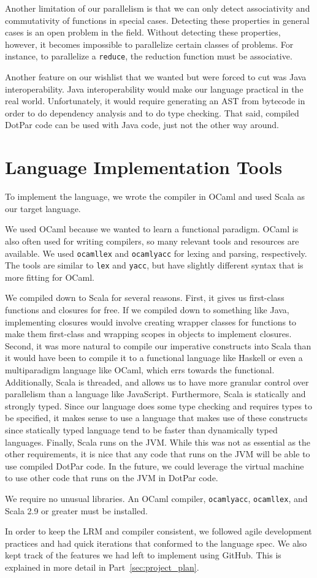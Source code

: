 Another limitation of our parallelism is that we can only detect associativity
and commutativity of functions in special cases. Detecting these properties in
general cases is an open problem in the field. Without detecting these
properties, however, it becomes impossible to parallelize certain classes of
problems. For instance, to parallelize a \verb$reduce$, the reduction function
must be associative.

Another feature on our wishlist that we wanted but were forced to cut was Java
interoperability. Java interoperability would make our language practical in the
real world. Unfortunately, it would require generating an AST from bytecode in
order to do dependency analysis and to do type checking. That said, compiled
DotPar code can be used with Java code, just not the other way around.

\section{Language Implementation Tools}
To implement the language, we wrote the compiler in OCaml and used Scala as our
target language.

We used OCaml because we wanted to learn a functional paradigm. OCaml is also
often used for writing compilers, so many relevant tools and resources are
available. We used \verb$ocamllex$ and \verb$ocamlyacc$ for lexing and parsing,
respectively. The tools are similar to \verb$lex$ and \verb$yacc$, but have
slightly different syntax that is more fitting for OCaml.

We compiled down to Scala for several reasons. First, it gives us first-class
functions and closures for free. If we compiled down to something like Java,
implementing closures would involve creating wrapper classes for functions to
make them first-class and wrapping scopes in objects to implement closures.
Second, it was more natural to compile our imperative constructs into Scala than
it would have been to compile it to a functional language like Haskell or even a
multiparadigm language like OCaml, which errs towards the functional.
Additionally, Scala is threaded, and allows us to have more granular control
over parallelism than a language like JavaScript. Furthermore, Scala is
statically and strongly typed. Since our language does some type checking and
requires types to be specified, it makes sense to use a language that makes use
of these constructs since statically typed language tend to be faster than
dynamically typed languages. Finally, Scala runs on the JVM\@. While this was not
as essential as the other requirements, it is nice that any code that runs on
the JVM will be able to use compiled DotPar code. In the future, we could
leverage the virtual machine to use other code that runs on the JVM in DotPar
code.

We require no unusual libraries. An OCaml compiler, \verb$ocamlyacc$,
\verb$ocamllex$, and Scala 2.9 or greater must be installed.

In order to keep the LRM and compiler consistent, we followed agile development
practices and had quick iterations that conformed to the language spec. We also
kept track of the features we had left to implement using GitHub. This is
explained in more detail in Part~\ref{sec:project_plan}.
